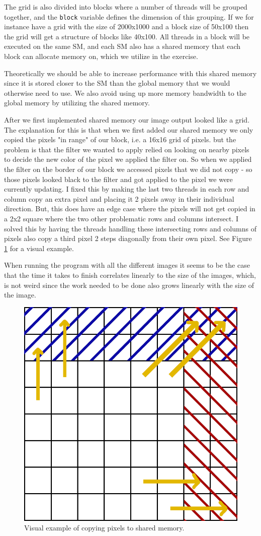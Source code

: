 \documentclass[a4paper, 12pt]{article}
\def\code#1{\texttt{#1}}
\def\f#1{Figure \ref{fig:#1}}
\begin{document}
The grid is also divided into blocks where a number of threads will be grouped together, and the \code{block} variable defines the dimension of this grouping. If we for instance have a grid with the size of 2000x1000 and a block size of 50x100 then the grid will get a structure of blocks like 40x100. All threads in a block will be executed on the same SM, and each SM also has a shared memory that each block can allocate memory on, which we utilize in the exercise.

Theoretically we should be able to increase performance with this shared memory since it is stored closer to the SM than the global memory that we would otherwise need to use. We also avoid using up more memory bandwidth to the global memory by utilizing the shared memory.

After we first implemented shared memory our image output looked like a grid. The explanation for this is that when we first added our shared memory we only copied the pixels "in range" of our block, i.e. a 16x16 grid of pixels. but the problem is that the filter we wanted to apply relied on looking on nearby pixels to decide the new color of the pixel we applied the filter on. So when we applied the filter on the border of our block we accessed pixels that we did not copy - so those pixels looked black to the filter and got applied to the pixel we were currently updating. I fixed this by making the last two threads in each row and column copy an extra pixel and placing it 2 pixels away in their individual direction. But, this does have an edge case where the pixels will not get copied in a 2x2 square where the two other problematic rows and columns intersect. I solved this by having the threads handling these intersecting rows and columns of pixels also copy a third pixel 2 steps diagonally from their own pixel. See \f{shared_memory} for a visual example.

When running the program with all the different images it seems to be the case that the time it takes to finish correlates linearly to the size of the images, which, is not weird since the work needed to be done also grows linearly with the size of the image.

\begin{figure}
    \centering
    \includegraphics[width=0.5\linewidth]{images/shared_memory.png}
    \caption{Visual example of copying pixels to shared memory.}
    \label{fig:shared_memory}
\end{figure}
\end{document}
